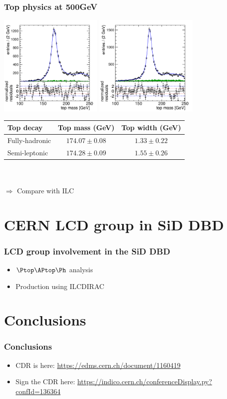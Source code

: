 \documentclass{beamer}
\begin{document}
\begin{frame}
\frametitle{Top physics at 500GeV}
\centering
\includegraphics[width=5cm]{FinalFit-SemiLeptonic}
\includegraphics[width=5cm]{FinalFit-FullHadronic}\\
{\scriptsize
\begin{tabular}{l c c }
\toprule
 Top decay & Top mass (GeV) & Top width (GeV)\\
\midrule
                            Fully-hadronic & $174.07 \pm 0.08$ &  $1.33 \pm 0.22$\\
                            Semi-leptonic & $174.28 \pm 0.09$ &  $1.55 \pm 0.26$\\
\end{tabular}}\\
~\\
$\Rightarrow$ Compare with ILC
\end{frame}



\section[LCD for the DBD]{CERN LCD group in SiD DBD}
\begin{frame}
\frametitle{LCD group involvement in the SiD DBD}
\begin{itemize}
  \item $\Ptop\APtop\Ph$ analysis
  \item Production using ILCDIRAC
\end{itemize}
\end{frame}

\section{Conclusions}
\begin{frame}
\frametitle{Conclusions}

\begin{itemize}
  \item CDR is here:  \url{https://edms.cern.ch/document/1160419}
  \item Sign the CDR here:
  \url{https://indico.cern.ch/conferenceDisplay.py?confId=136364}
\end{itemize}
\end{frame}
\end{document}
